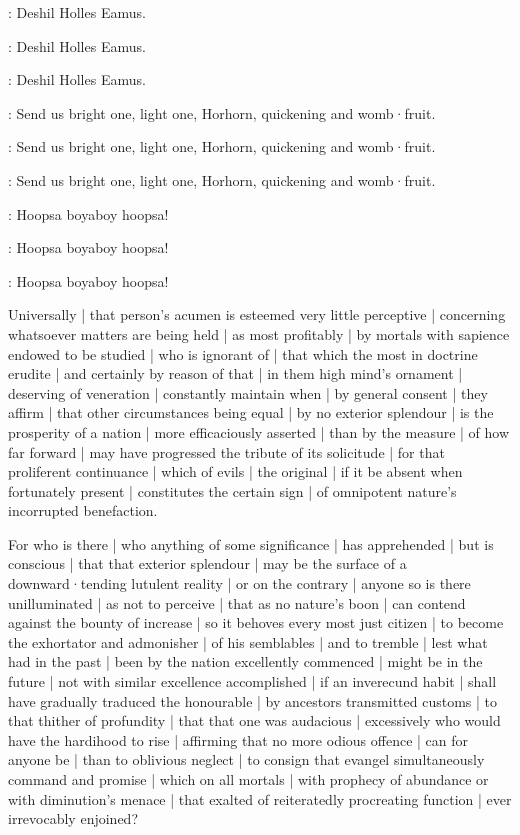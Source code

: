 
:
Deshil Holles Eamus.

:
Deshil Holles Eamus.

:
Deshil Holles Eamus.

:
Send us bright one,
light one,
Horhorn,
quickening and womb·fruit.

:
Send us bright one,
light one,
Horhorn,
quickening and womb·fruit.

:
Send us bright one,
light one,
Horhorn,
quickening and womb·fruit.

\Nurses:
Hoopsa boyaboy hoopsa!

\Nurses:
Hoopsa boyaboy hoopsa!

\Nurses:
Hoopsa boyaboy hoopsa!


Universally |
that person's acumen is esteemed very little perceptive |
concerning whatsoever matters are being held |
as most profitably |
by mortals with sapience endowed to be studied |
who is ignorant of |
that which the most in doctrine erudite |
and certainly by reason of that |
in them high mind's ornament |
deserving of veneration |
constantly maintain when |
by general consent |
they affirm |
that other circumstances being equal |
by no exterior splendour |
is the prosperity of a nation |
more efficaciously asserted |
than by the measure |
of how far forward |
may have progressed the tribute of its solicitude |
for that proliferent continuance |
which of evils |
the original |
if it be absent when fortunately present |
constitutes the certain sign |
of omnipotent nature's incorrupted benefaction.

For who is there |
who anything of some significance |
has apprehended |
but is conscious |
that that exterior splendour |
may be the surface of a downward·tending lutulent reality |
or on the contrary |
anyone so is there unilluminated |
as not to perceive |
that as no nature's boon |
can contend against the bounty of increase |
so it behoves every most just citizen |
to become the exhortator and admonisher |
of his semblables |
and to tremble |
lest what had in the past |
been by the nation excellently commenced |
might be in the future |
not with similar excellence accomplished |
if an inverecund habit |
shall have gradually traduced the honourable |
by ancestors transmitted customs |
to that thither of profundity |
that that one was audacious |
excessively who would have the hardihood to rise |
affirming that no more odious offence |
can for anyone be |
than to oblivious neglect |
to consign that evangel simultaneously command and promise |
which on all mortals |
with prophecy of abundance or with diminution's menace |
that exalted of reiteratedly procreating function |
ever irrevocably enjoined?

